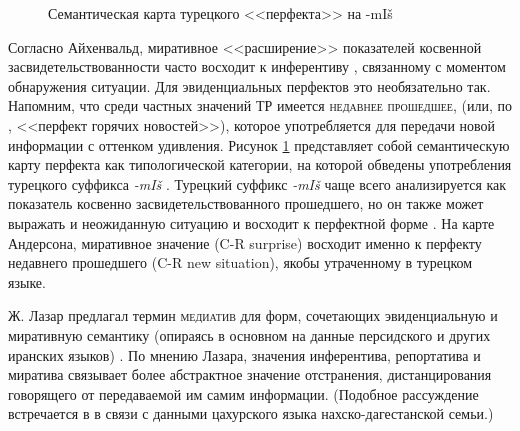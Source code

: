 \begin{figure}[H]
\centering
\caption{Семантическая карта турецкого <<перфекта>> на -mIš \citep[234]{anderson1982}}
\label{fig:semturk}
\vspace{0.5cm}
\end{figure}

Согласно Айхенвальд, миративное <<расширение>> показателей косвенной засвидетельствованности часто восходит к инферентиву \citep[195]{aikhenvald2004}, связанному с моментом обнаружения ситуации. Для эвиденциальных перфектов это необязательно так. Напомним, что среди частных значений ТР имеется \textsc{недавнее прошедшее}, (или, по \citep{mccawley1971}, <<перфект горячих новостей>>), которое употребляется для передачи новой информации с оттенком удивления. Рисунок \ref{fig:semturk} представляет собой семантическую карту перфекта как типологической категории, на которой обведены употребления турецкого суффикса \textit{-mIš} \citep[234]{anderson1982}. Турецкий суффикс \textit{-mIš} чаще всего анализируется как показатель косвенно засвидетельствованного прошедшего, но он также может выражать и неожиданную ситуацию и восходит к перфектной форме \citep[188--190]{slobinaksukoc1982}. На карте Андерсона, миративное значение (C-R surprise) восходит именно к перфекту недавнего прошедшего (C-R new situation), якобы утраченному в турецком языке.
\par Ж. Лазар предлагал термин \textsc{медиатив} для форм, сочетающих эвиденциальную и миративную семантику (опираясь в основном на данные персидского и других иранских языков) \citep{lazard1956}. По мнению Лазара, значения инферентива, репортатива и миратива связывает более абстрактное значение отстранения, дистанцирования говорящего от передаваемой им самим информации. (Подобное рассуждение встречается в \citep{maisaktatevosov2007} в связи с данными цахурского языка нахско-дагестанской семьи.)

